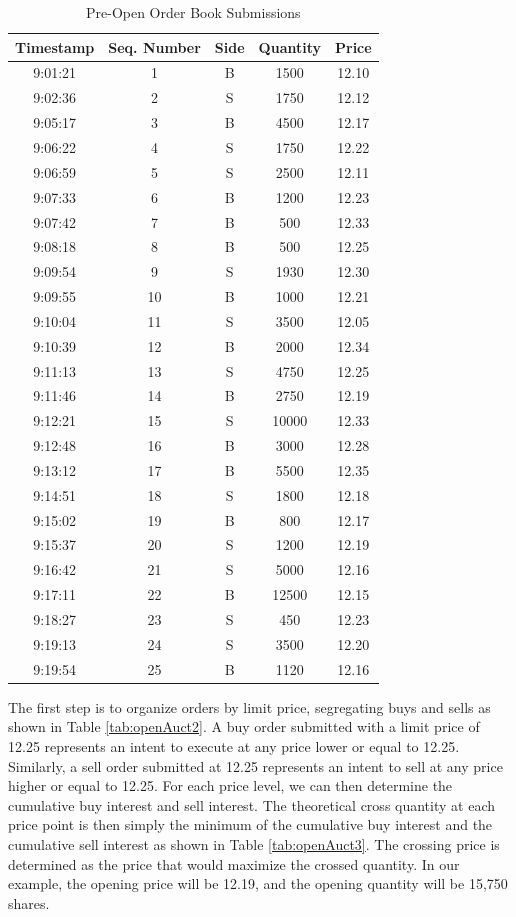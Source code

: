 \begin{table}[!ht]
   \centering
   \caption{Pre-Open Order Book Submissions\label{tab:openAuct}}
   \hspace*{-2.0cm}
   \begin{tabular}{ccccc} 
	Timestamp & Seq. Number & Side & Quantity & Price \\ \hline
	9:01:21 & 1  &  B & 1500 &  12.10 \\
	9:02:36 & 2  &  S & 1750 & 12.12 \\	
	9:05:17 & 3  &  B & 4500  & 12.17 \\	
	9:06:22 & 4  &  S & 1750 & 12.22 \\
	9:06:59 & 5  &  S & 2500 & 12.11 \\	
	9:07:33 & 6 &  B & 1200 & 12.23 \\	
	9:07:42 & 7  &  B & 500 & 12.33 \\	
	9:08:18 & 8 &  B & 500 & 12.25 \\	
	9:09:54 & 9 &  S & 1930 & 12.30 \\	
	9:09:55 & 10 & B & 1000 & 12.21 \\	
	9:10:04 & 11 & S & 3500 & 12.05 \\	
	9:10:39 & 12 & B & 2000 & 12.34 \\	
	9:11:13 & 13 &  S & 4750 & 12.25 \\	
	9:11:46 &  14 & B  & 2750 & 12.19 \\	
	9:12:21 &  15 & S  & 10000 & 12.33 \\	
	9:12:48 &  16 & B  & 3000 & 12.28 \\	
	9:13:12 &  17 & B  & 5500 & 12.35 \\
	9:14:51 &  18 & S & 1800 & 12.18 \\
	9:15:02 &  19 & B & 800 & 12.17 \\
	9:15:37 &  20 & S & 1200 & 12.19 \\
	9:16:42 &  21 & S & 5000 & 12.16 \\
	9:17:11 &  22 & B & 12500 & 12.15 \\
	9:18:27 &  23 & S & 450 & 12.23 \\
	9:19:13 &  24 & S & 3500 & 12.20 \\	
	9:19:54 &  25 & B & 1120 & 12.16
   \end{tabular}
\end{table}

The first step is to organize orders by limit price, segregating buys and sells as shown in Table \ref{tab:openAuct2}. A buy order submitted with a limit price of 12.25 represents an intent to execute at any price lower or equal to 12.25. Similarly, a sell order submitted at 12.25 represents an intent to sell at any price higher or equal to 12.25. For each price level, we can then determine the cumulative buy interest and sell interest. The theoretical cross quantity at each price point is then simply the minimum of the cumulative buy interest and the cumulative sell interest as shown in Table \ref{tab:openAuct3}. The crossing price is determined as the price that would maximize the crossed quantity. In our example, the opening price will be 12.19, and the opening quantity will be 15,750 shares. \\

